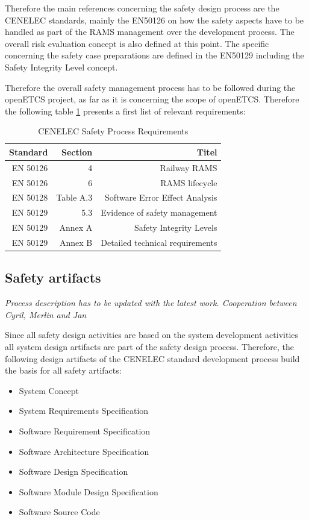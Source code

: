 \documentclass{template/openetcs_report}
\begin{document}
Therefore the main references concerning the safety design process are the CENELEC standards, mainly the EN50126 on how the safety aspects have to be handled as part of the RAMS management over the development process. The overall risk evaluation concept is also defined at this point. The specific concerning the safety case preparations are defined in the EN50129 including the Safety Integrity Level concept. 

Therefore the overall safety management process has to be followed during the openETCS project, as far as it is concerning the scope of openETCS. Therefore the following table \ref{tab:Safety Process Requirements} presents a first list of relevant requirements:

\begin{table}[htbp]
  \centering
  \caption{CENELEC Safety Process Requirements}
    \begin{tabular}{r|r|r}
    Standard & Section & Titel \\
    \hline
     EN 50126 & 4 & Railway RAMS  \\ 
    EN 50126 & 6 & RAMS lifecycle \\
     EN 50128 & Table A.3 & Software Error Effect Analysis\\
    EN 50129 & 5.3 & Evidence of safety management \\
    EN 50129 & Annex A & Safety Integrity Levels \\
    EN 50129 & Annex B & Detailed technical requirements \\
    \end{tabular}%
  \label{tab:Safety Process Requirements}%
\end{table}%




\subsection{Safety artifacts}

\textit{Process description has to be updated with the latest work. Cooperation between Cyril, Merlin and Jan}

Since all safety design activities are based on the system development activities all system design artifacts are part of the safety design process. Therefore, the following design artifacts of the CENELEC standard development process build the basis for all safety artifacts:

\begin{itemize}
\item System Concept
\item System Requirements Specification
\item Software Requirement Specification
\item Software Architecture Specification
\item Software Design Specification
\item Software Module Design Specification
\item Software Source Code
\end{itemize}
\end{document}
